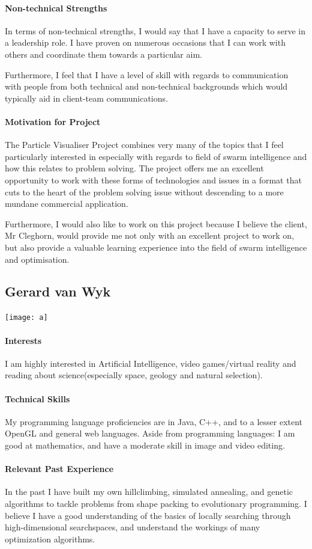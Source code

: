 \documentclass[12pt]{article}
\begin{document}
\paragraph{Non-technical Strengths}
In terms of non-technical strengths, I would say that I have a capacity to serve in a leadership role. I have proven on numerous occasions that I can work with others and coordinate them towards a particular aim.

Furthermore, I feel that I have a level of skill with regards to communication with people from both technical and non-technical backgrounds which would typically aid in client-team communications.
\paragraph{Motivation for Project}
The Particle Visualiser Project combines very many of the topics that I feel particularly interested in especially with regards to field of swarm intelligence and how this relates to problem solving. The project offers me an excellent opportunity to work with these forms of technologies and issues in a format that cuts to the heart of the problem solving issue without descending to a more mundane commercial application.

Furthermore, I would also like to work on this project because I believe the client, Mr Cleghorn, would provide me not only with an excellent project to work on, but also provide a valuable learning experience into the field of swarm intelligence and optimisation.

\subsection{Gerard van Wyk}
\texttt{[image: a]}
\paragraph{Interests}
I am highly interested in Artificial Intelligence, video games/virtual reality and reading about science(especially space, geology and natural selection).
\paragraph{Technical Skills}
My programming language proficiencies are in Java, C++, and to a lesser extent OpenGL and general web languages.
Aside from programming languages: I am good at mathematics, and have a moderate skill in image and video editing.
\paragraph{Relevant Past Experience}
In the past I have built my own hillclimbing, simulated annealing, and genetic algorithms to tackle problems from shape packing to evolutionary programming. I believe I have a good understanding of the basics of locally searching through high-dimensional searchspaces, and understand the workings of many optimization algorithms.
\end{document}
